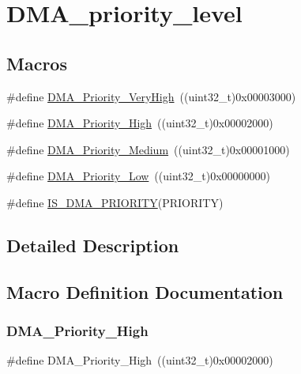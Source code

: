 \hypertarget{group___d_m_a__priority__level}{}\section{D\+M\+A\+\_\+priority\+\_\+level}
\label{group___d_m_a__priority__level}
\subsection*{Macros}
\begin{DoxyCompactItemize}
\item 
\#define \mbox{\hyperlink{group___d_m_a__priority__level_gadccd2f8b2ac24ba4fd485dd5b9b48671}{D\+M\+A\+\_\+\+Priority\+\_\+\+Very\+High}}~((uint32\+\_\+t)0x00003000)
\item 
\#define \mbox{\hyperlink{group___d_m_a__priority__level_gae2441c0b4d4ba9945a6f4f7d08045a8e}{D\+M\+A\+\_\+\+Priority\+\_\+\+High}}~((uint32\+\_\+t)0x00002000)
\item 
\#define \mbox{\hyperlink{group___d_m_a__priority__level_ga8e0d4a958f4288c6c759945789490f38}{D\+M\+A\+\_\+\+Priority\+\_\+\+Medium}}~((uint32\+\_\+t)0x00001000)
\item 
\#define \mbox{\hyperlink{group___d_m_a__priority__level_gaf414e0aa8dd42aee6f83f88ab6175179}{D\+M\+A\+\_\+\+Priority\+\_\+\+Low}}~((uint32\+\_\+t)0x00000000)
\item 
\#define \mbox{\hyperlink{group___d_m_a__priority__level_gaa1cae2ab458948511596467c87cd02b6}{I\+S\+\_\+\+D\+M\+A\+\_\+\+P\+R\+I\+O\+R\+I\+TY}}(P\+R\+I\+O\+R\+I\+TY)
\end{DoxyCompactItemize}


\subsection{Detailed Description}


\subsection{Macro Definition Documentation}
\mbox{\label{group___d_m_a__priority__level_gae2441c0b4d4ba9945a6f4f7d08045a8e}} 
\subsubsection{\texorpdfstring{DMA\_Priority\_High}{DMA\_Priority\_High}}
{\footnotesize\ttfamily \#define D\+M\+A\+\_\+\+Priority\+\_\+\+High~((uint32\+\_\+t)0x00002000)}

